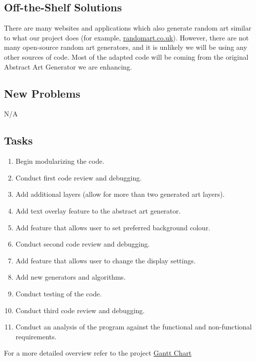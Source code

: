 \documentclass[12pt, titlepage]{article}
\begin{document}
\subsection{Off-the-Shelf Solutions}

There are many websites and applications which also generate random art similar to what our project does (for example, \href{https://www.randomart.co.uk/random-art-generator.aspx}{randomart.co.uk}). However, there are not many open-source random art generators, and it is unlikely we will be using any other sources of code. Most of the adapted code will be coming from the original Abstract Art Generator we are enhancing.

\subsection{New Problems}

N/A

\subsection{Tasks}

\begin{enumerate}
    \item Begin modularizing the code.
    \item Conduct first code review and debugging.
    \item Add additional layers (allow for more than two generated art layers).
    \item Add text overlay feature to the abstract art generator.
    \item Add feature that allows user to set preferred background colour.
    \item Conduct second code review and debugging.
    \item Add feature that allows user to change the display settings.
    \item Add new generators and algorithms.
    \item Conduct testing of the code.
    \item Conduct third code review and debugging.
    \item Conduct an analysis of the program against the functional and non-functional requirements.
\end{enumerate}

For a more detailed overview refer to the project \href{https://gitlab.cas.mcmaster.ca/3xa3-l3-g10/3xa3-l3-g10/-/tree/main/ProjectSchedule}{Gantt Chart}
\end{document}
